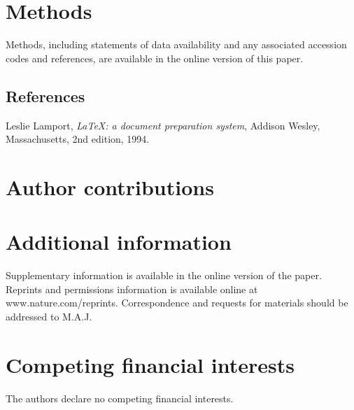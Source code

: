 \documentclass[twocolumn, linenumbers, superscriptaddress]{revtex4-1}
\begin{document}
	\section*{Methods}
		Methods, including statements of data availability and any associated accession codes and references, are available in the online version of this paper.
	
	\begin{thebibliography}{50}
		\section*{References}	
			Leslie Lamport,
			\textit{\LaTeX: a document preparation system},
			Addison Wesley, Massachusetts,
			2nd edition,
			1994.

	\end{thebibliography}

	\begin{acknowledgements}
		\blindtext
	\end{acknowledgements}

	\section*{Author contributions}
		\blindtext
	
	\section*{Additional information}
		Supplementary information is available in the online version of the paper.
		Reprints and permissions information is available online at www.nature.com/reprints.
		Correspondence and requests for materials should be addressed to M.A.J.
	
	\section*{Competing financial interests}
		The authors declare no competing financial interests.
	
\end{document}

